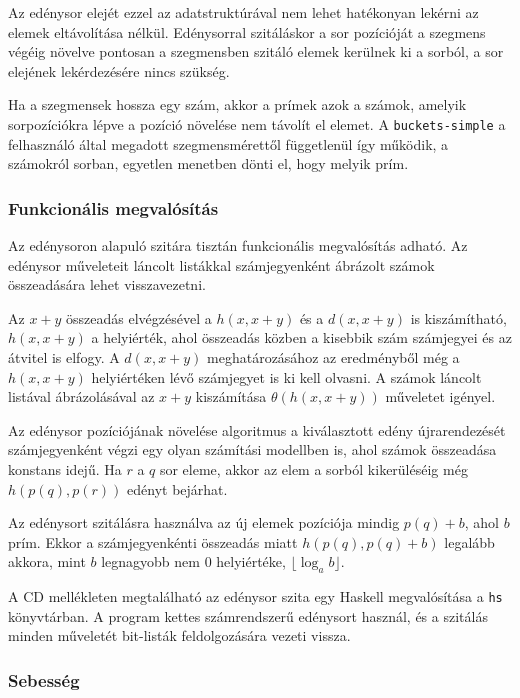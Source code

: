 Az edénysor elejét ezzel az adatstruktúrával nem lehet hatékonyan lekérni az elemek eltávolítása nélkül.
Edénysorral szitáláskor a sor pozícióját a szegmens végéig növelve pontosan a szegmensben szitáló elemek kerülnek ki a sorból, a sor elejének lekérdezésére nincs szükség.

Ha a szegmensek hossza egy szám, akkor a prímek azok a számok, amelyik sorpozíciókra lépve a pozíció növelése nem távolít el elemet. A \texttt{buckets-simple} a felhasználó által megadott szegmensmérettől függetlenül így működik, a számokról sorban, egyetlen menetben dönti el, hogy melyik prím.

\subsubsection{Funkcionális megvalósítás}

Az edénysoron alapuló szitára tisztán funkcionális megvalósítás adható.
Az edénysor műveleteit láncolt listákkal számjegyenként ábrázolt számok összeadására lehet visszavezetni.

Az $x+y$ összeadás elvégzésével a $h(x, x+y)$ és a $d(x, x+y)$ is kiszámítható, $h(x, x+y)$ a helyiérték, ahol összeadás közben a kisebbik szám számjegyei és az átvitel is elfogy. A $d(x, x+y)$ meghatározásához az eredményből még a $h(x, x+y)$ helyiértéken lévő számjegyet is ki kell olvasni.
A számok láncolt listával ábrázolásával az $x+y$ kiszámítása $\theta(h(x, x+y))$ műveletet igényel.

Az edénysor pozíciójának növelése algoritmus a kiválasztott edény újrarendezését számjegyenként végzi egy olyan számítási modellben is, ahol számok összeadása konstans idejű.
Ha $r$ a $q$ sor eleme, akkor az elem a sorból kikerüléséig még $h(p(q), p(r))$ edényt bejárhat.

Az edénysort szitálásra használva az új elemek pozíciója mindig $p(q)+b$, ahol $b$ prím.
Ekkor a számjegyenkénti összeadás miatt $h(p(q), p(q)+b)$ legalább akkora, mint $b$ legnagyobb nem $0$ helyiértéke, $\lfloor \log_{a}{b} \rfloor$.

A CD mellékleten megtalálható az edénysor szita egy Haskell megvalósítása a \texttt{hs} könyvtárban.
A program kettes számrendszerű edénysort használ, és a szitálás minden műveletét bit-listák feldolgozására vezeti vissza.

\subsubsection{Sebesség}

